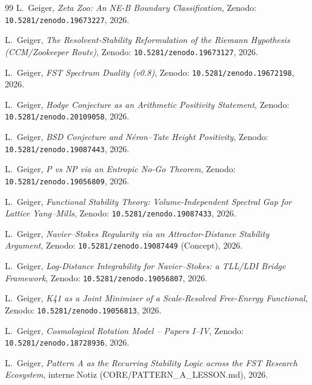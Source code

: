 \documentclass[11pt,a4paper]{article}
\theoremstyle{remark}
\begin{document}
\begin{thebibliography}{99}
L.~Geiger,
\emph{Zeta Zoo: An NE-B Boundary Classification},
Zenodo: \texttt{10.5281/zenodo.19673227}, 2026.

L.~Geiger,
\emph{The Resolvent-Stability Reformulation of the Riemann Hypothesis
(CCM/Zookeeper Route)},
Zenodo: \texttt{10.5281/zenodo.19673127}, 2026.

L.~Geiger,
\emph{FST Spectrum Duality (v0.8)},
Zenodo: \texttt{10.5281/zenodo.19672198}, 2026.

L.~Geiger,
\emph{Hodge Conjecture as an Arithmetic Positivity Statement},
Zenodo: \texttt{10.5281/zenodo.20109058}, 2026.

L.~Geiger,
\emph{BSD Conjecture and Néron--Tate Height Positivity},
Zenodo: \texttt{10.5281/zenodo.19087443}, 2026.

L.~Geiger,
\emph{P vs NP via an Entropic No-Go Theorem},
Zenodo: \texttt{10.5281/zenodo.19056809}, 2026.

L.~Geiger,
\emph{Functional Stability Theory: Volume-Independent Spectral Gap
for Lattice Yang--Mills},
Zenodo: \texttt{10.5281/zenodo.19087433}, 2026.

L.~Geiger,
\emph{Navier--Stokes Regularity via an Attractor-Distance
Stability Argument},
Zenodo: \texttt{10.5281/zenodo.19087449} (Concept), 2026.

L.~Geiger,
\emph{Log-Distance Integrability for Navier--Stokes: a TLL/LDI
Bridge Framework},
Zenodo: \texttt{10.5281/zenodo.19056807}, 2026.

L.~Geiger,
\emph{K41 as a Joint Minimiser of a Scale-Resolved Free-Energy
Functional},
Zenodo: \texttt{10.5281/zenodo.19056813}, 2026.

L.~Geiger,
\emph{Cosmological Rotation Model -- Papers I--IV},
Zenodo: \texttt{10.5281/zenodo.18728936}, 2026.

L.~Geiger,
\emph{Pattern A as the Recurring Stability Logic across the FST
Research Ecosystem}, interne Notiz (CORE/PATTERN\_A\_LESSON.md),
2026.

\end{thebibliography}
\end{document}
